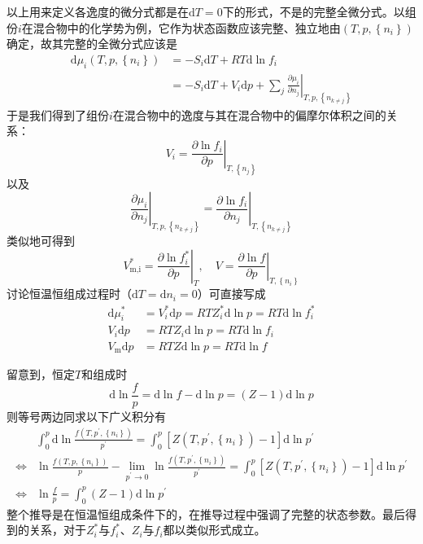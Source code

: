 \documentclass[main.tex]{subfiles}
\begin{document}
以上用来定义各逸度的微分式都是在$\mathrm{d}T=0$下的形式，不是的完整全微分式。以组份$i$在混合物中的化学势为例，它作为状态函数应该完整、独立地由$\left(T,p,\left\{n_i\right\}\right)$确定，故其完整的全微分式应该是
\begin{align*}
    \mathrm{d}\mu_i\left(T,p,\left\{n_i\right\}\right) & =-S_i\mathrm{d}T+RT\mathrm{d}\ln f_i                                                                                   \\
                                                       & =-S_i\mathrm{d}T+V_i\mathrm{d}p+\sum_j\left.\frac{\partial\mu_i}{\partial n_j}\right|_{T,p,\left\{n_{k\neq j}\right\}}
\end{align*}
于是我们得到了组份$i$在混合物中的逸度与其在混合物中的偏摩尔体积之间的关系：
\[V_i=\left.\frac{\partial\ln f_i}{\partial p}\right|_{T,\left\{n_j\right\}}\]
以及
\[\left.\frac{\partial\mu_i}{\partial n_j}\right|_{T,p,\left\{n_{k\neq j}\right\}}=\left.\frac{\partial\ln f_i}{\partial n_j}\right|_{T,\left\{n_{k\neq j}\right\}}\]
类似地可得到
\[V_\text{m,i}^*=\left.\frac{\partial\ln f_i^*}{\partial p}\right|_T,\quad V=\left.\frac{\partial\ln f}{\partial p}\right|_{T,\left\{n_i\right\}}\]
讨论恒温恒组成过程时（$\mathrm{d}T=\mathrm{d}n_i=0$）可直接写成
\begin{align*}
    \mathrm{d}\mu_i^*     & =V_i^*\mathrm{d}p=RTZ_i^*\mathrm{d}\ln p=RT\mathrm{d}\ln f_i^* \\
    V_i\mathrm{d}p        & =RTZ_i\mathrm{d}\ln p=RT\mathrm{d}\ln f_i                      \\
    V_\text{m}\mathrm{d}p & =RTZ\mathrm{d}\ln p=RT\mathrm{d}\ln f
\end{align*}

留意到，恒定$T$和组成时
\[\mathrm{d}\ln\frac{f}{p}=\mathrm{d}\ln f-\mathrm{d}\ln p=\left(Z-1\right)\mathrm{d}\ln p\]
则等号两边同求以下广义积分有
\begin{align*}
                    & \int_0^p\mathrm{d}\ln\frac{f\left(T,p^\prime,\left\{n_i\right\}\right)}{p^\prime}=\int_0^p\left[Z\left(T,p^\prime,\left\{n_i\right\}\right)-1\right]\mathrm{d}\ln p^\prime                                                     \\
    \Leftrightarrow & \ln\frac{f\left(T,p,\left\{n_i\right\}\right)}{p}-\lim_{p^\prime\to 0}\ln\frac{f\left(T,p^\prime,\left\{n_i\right\}\right)}{p^\prime}=\int_0^p\left[Z\left(T,p^\prime,\left\{n_i\right\}\right)-1\right]\mathrm{d}\ln p^\prime \\
    \Leftrightarrow & \ln\frac{f}{p}=\int_0^p\left(Z-1\right)\mathrm{d}\ln p^\prime
\end{align*}
整个推导是在恒温恒组成条件下的，在推导过程中强调了完整的状态参数。最后得到的关系，对于$Z_i^*$与$f_i^*$、$Z_i$与$f_i$都以类似形式成立。
\end{document}
